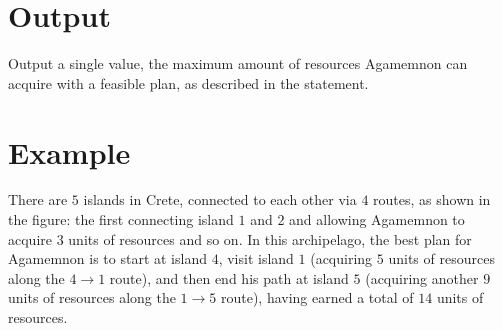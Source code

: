 \section*{Output}

Output a single value, the maximum amount of resources Agamemnon can acquire with a feasible plan, as described in the statement.

\section*{Example}

There are $5$ islands in Crete, connected to each other via $4$ routes, as shown in the figure: the first connecting island $1$ and $2$ and allowing Agamemnon to acquire $3$ units of resources and so on. In this archipelago, the best plan for Agamemnon is to start at island $4$, visit island $1$ (acquiring $5$ units of resources along the $4\to1$ route), and then end his path at island $5$ (acquiring another $9$ units of resources along the $1\to5$ route), having earned a total of $14$ units of resources.
